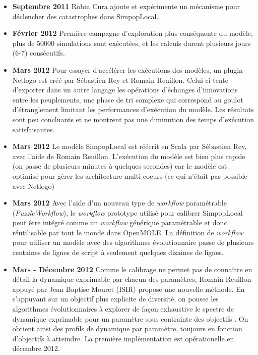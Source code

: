 \begin{itemize}[label=\textbullet]
\item {\textbf{Septembre 2011}} Robin Cura ajoute et expérimente un mécanisme pour déclencher des catastrophes dans SimpopLocal.

\item {\textbf{Février 2012}} Première campagne d'exploration plus conséquente du modèle, plus de $\num{50000}$ simulations sont exécutées, et les calculs durent plusieurs jours (6-7) consécutifs.

\item {\textbf{Mars 2012}} Pour essayer d'accélérer les exécutions des modèles, un plugin Netlogo est créé par Sébastien Rey et Romain Reuillon. Celui-ci tente d'exporter dans un autre langage les opérations d'échanges d'innovations entre les peuplements, une phase de tri complexe qui correspond au goulot d'étranglement limitant les performances d'exécution du modèle. Les résultats sont peu concluants et ne montrent pas une diminution des temps d'exécution satisfaisantes.

\item {\textbf{Mars 2012}} Le modèle SimpopLocal est réécrit en Scala par Sébastien Rey, avec l'aide de Romain Reuillon. L'exécution du modèle est bien plus rapide (on passe de plusieurs minutes à quelques secondes) car le modèle est optimisé pour gérer les architecture multi-coeurs (ce qui n'était pas possible avec Netlogo)

\item {\textbf{Mars 2012}} Avec l'aide d'un nouveau type de \textit{workflow} paramétrable (\textit{PuzzleWorkflow}), le \textit{workflow} prototype utilisé pour calibrer SimpopLocal peut être intégré comme un \textit{workflow} générique paramétrable et donc réutilisable par tout le monde dans OpenMOLE. La définition de \textit{workflow} pour utiliser un modèle avec des algorithmes évolutionnaire passe de plusieurs centaines de lignes de script à seulement quelques dizaines de lignes.

\item {\textbf{Mars - Décembre 2012}} Comme le calibrage ne permet pas de connaître en détail la dynamique exprimable par chacun des paramètres, Romain Reuillon appuyé par Jean Baptise Mouret (ISIR) propose une nouvelle méthode. En s'appuyant sur un objectif plus explicite de diversité, on pousse les algorithmes évolutionnaires à explorer de façon exhaustive le spectre de dynamique exprimable pour un paramètre sous contrainte des objectifs \autocite{Reuillon2015}. On obtient ainsi des profils de dynamique par paramètre, toujours en fonction d'objectifs à atteindre. La première implémentation est opérationelle en décembre 2012.


\end{itemize}
